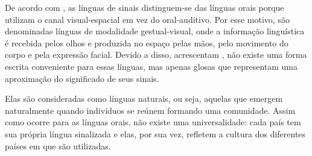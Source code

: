 



De acordo com , as línguas de sinais distinguem-se das línguas orais porque utilizam o canal visual-espacial em vez do oral-auditivo. Por esse motivo, são denominadas línguas de modalidade gestual-visual, onde a informação linguística é recebida pelos olhos e produzida no espaço pelas mãos, pelo movimento do corpo e pela expressão facial.
Devido a disso, acrescentam , não existe uma forma escrita conveniente para essas línguas, mas apenas glosas que representam uma aproximação do significado de seus sinais.

Elas são consideradas como línguas naturais, ou seja, aquelas que emergem naturalmente quando indivíduos se reúnem formando uma comunidade. Assim como ocorre para as línguas orais, não existe uma universalidade: cada país tem sua própria língua sinalizada e elas, por sua vez, refletem a cultura dos diferentes países em que são utilizadas.




